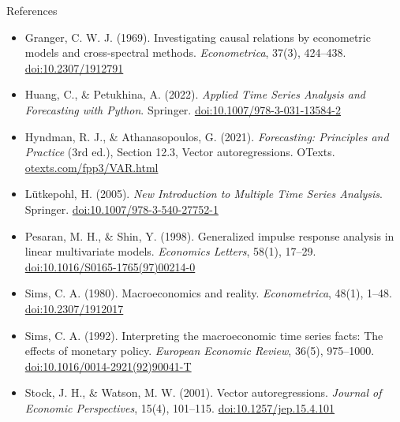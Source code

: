 \begin{frame}{References}
\itemsize{\tiny}
\begin{itemize}
    \item Granger, C. W. J. (1969). Investigating causal relations by econometric models and cross-spectral methods. \textit{Econometrica}, 37(3), 424--438. \href{https://doi.org/10.2307/1912791}{doi:10.2307/1912791}
    \item Huang, C., \& Petukhina, A. (2022). \textit{Applied Time Series Analysis and Forecasting with Python}. Springer. \href{https://doi.org/10.1007/978-3-031-13584-2}{doi:10.1007/978-3-031-13584-2}
    \item Hyndman, R. J., \& Athanasopoulos, G. (2021). \textit{Forecasting: Principles and Practice} (3rd ed.), Section 12.3, Vector autoregressions. OTexts. \href{https://otexts.com/fpp3/VAR.html}{otexts.com/fpp3/VAR.html}
    \item Lütkepohl, H. (2005). \textit{New Introduction to Multiple Time Series Analysis}. Springer. \href{https://doi.org/10.1007/978-3-540-27752-1}{doi:10.1007/978-3-540-27752-1}
    \item Pesaran, M. H., \& Shin, Y. (1998). Generalized impulse response analysis in linear multivariate models. \textit{Economics Letters}, 58(1), 17--29. \href{https://doi.org/10.1016/S0165-1765(97)00214-0}{doi:10.1016/S0165-1765(97)00214-0}
    \item Sims, C. A. (1980). Macroeconomics and reality. \textit{Econometrica}, 48(1), 1--48. \href{https://doi.org/10.2307/1912017}{doi:10.2307/1912017}
    \item Sims, C. A. (1992). Interpreting the macroeconomic time series facts: The effects of monetary policy. \textit{European Economic Review}, 36(5), 975--1000. \href{https://doi.org/10.1016/0014-2921(92)90041-T}{doi:10.1016/0014-2921(92)90041-T}
    \item Stock, J. H., \& Watson, M. W. (2001). Vector autoregressions. \textit{Journal of Economic Perspectives}, 15(4), 101--115. \href{https://doi.org/10.1257/jep.15.4.101}{doi:10.1257/jep.15.4.101}
\end{itemize}
\end{frame}


